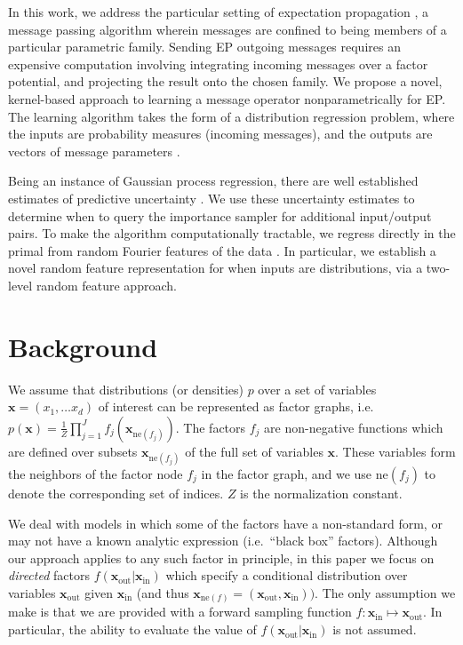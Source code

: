 \documentclass[english]{article}
\theoremstyle{plain}
\theoremstyle{plain}
\newcommand{\bx}{\mathbf{x}}				%
\newcommand{\factor}{f}				%
\newcommand{\fis}[1]{\mathrm{ne}(#1)}   	%
\newcommand{\fx}[1]{ \mathbf{x}_{\mathrm{ne}(#1)} }   	%
\newcommand{\xin}{\mathbf{x}_{ \mathrm{in} }} 			%
\newcommand{\xout}{\mathbf{x}_{ \mathrm{out} }}			%
\begin{document}
In this work, we address the particular setting of expectation propagation 
\citep[EP;][]{Minka2001}, a message passing algorithm wherein messages are confined to
being members of a particular parametric family. Sending EP outgoing messages
requires an expensive computation involving integrating incoming messages over a
factor potential, and projecting the result onto the chosen family. We propose
a novel, kernel-based approach to learning a message operator nonparametrically
for EP. The learning algorithm takes the form of a
distribution regression problem, where the inputs are probability measures (incoming messages), and
the outputs are vectors of message parameters \citep{Szabo2014}.  

Being an instance of Gaussian process regression, there are well established
estimates of predictive uncertainty \citep[Ch. 2]{RasWil06}.  We use these
uncertainty estimates to determine when to query the importance sampler for
additional input/output pairs.  To make the algorithm computationally
tractable, we regress  directly in the primal from random Fourier features of
the data \citep{Rahimi2007,Le2013,YanSmoZonWil14}.  In particular, we establish
a novel random feature representation for when inputs are distributions, via a
two-level random feature approach.




\section{Background}
\label{sec:EP}

We assume that distributions (or densities) $p$ over a set of variables 
$\bx = (x_1, \dots x_d)$ of interest can be represented as factor graphs, i.e.\
%
$p(\bx) = \frac{1}{Z} \prod_{j=1}^J \factor_j(\fx{\factor_j})$.
The factors $\factor_j$ are non-negative functions which are defined over subsets $\fx{\factor_j}$ of the full set of variables $\bx$. These variables form the neighbors of the factor node $\factor_j$ in the factor graph, and we use $\fis{\factor_j}$ to denote the corresponding set of indices. $Z$ is the normalization constant.

We deal with models in which some of the factors have a non-standard form, or
may not have a known analytic expression (i.e.\ ``black box'' factors).
Although our approach applies to any such factor in principle, in this paper we
focus on \textit{directed} factors $\factor(\xout | \xin)$ which specify a
conditional distribution over variables $\xout$ given $\xin$ (and thus
$\fx{\factor} = (\xout, \xin))$. The only assumption we make is that we are
provided with a forward sampling function $f: \xin \mapsto \xout$. 
In particular, the ability to evaluate the value of $\factor(\xout | \xin)$ is
not assumed.
\end{document}
